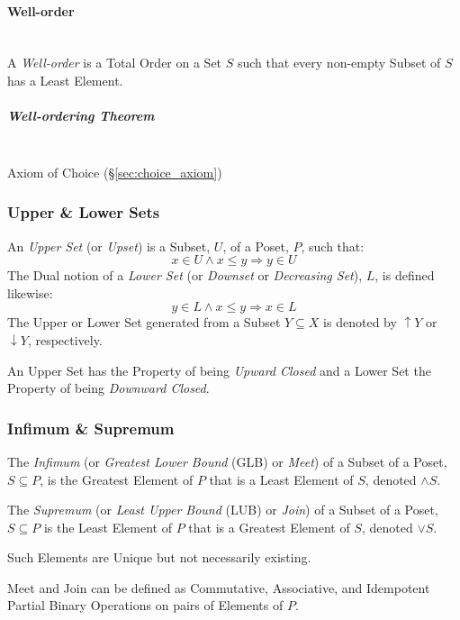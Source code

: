 \paragraph{Well-order}\label{sec:well_order} \hfill \\

A \emph{Well-order} is a Total Order on a Set $S$ such that every
non-empty Subset of $S$ has a Least Element.

\subparagraph{Well-ordering Theorem}\label{sec:wellorder_theorem}
\hfill \\

Axiom of Choice (\S\ref{sec:choice_axiom})



\subsubsection{Upper \& Lower Sets}\label{sec:upper_lower}

An \emph{Upper Set} (or \emph{Upset}) is a Subset, $U$, of a Poset,
$P$, such that:
\[
  x \in U \wedge x \leq y \Rightarrow y \in U
\]
The Dual notion of a \emph{Lower Set} (or \emph{Downset} or
\emph{Decreasing Set}), $L$, is defined likewise:
\[
  y \in L \wedge x \leq y \Rightarrow x \in L
\]
The Upper or Lower Set generated from a Subset $Y \subseteq X$ is
denoted by $\uparrow Y$ or $\downarrow Y$, respectively.

An Upper Set has the Property of being \emph{Upward Closed} and a
Lower Set the Property of being \emph{Downward Closed}.



\subsubsection{Infimum \& Supremum}\label{sec:glb_lub}

The \emph{Infimum} (or \emph{Greatest Lower Bound} (GLB) or
\emph{Meet}) of a Subset of a Poset, $S \subseteq P$, is the Greatest
Element of $P$ that is a Least Element of $S$, denoted $\wedge S$.

The \emph{Supremum} (or \emph{Least Upper Bound} (LUB) or \emph{Join})
of a Subset of a Poset, $S \subseteq P$ is the Least Element of $P$
that is a Greatest Element of $S$, denoted $\vee S$.

Such Elements are Unique but not necessarily existing.

Meet and Join can be defined as Commutative, Associative, and
Idempotent Partial Binary Operations on pairs of Elements of $P$.

